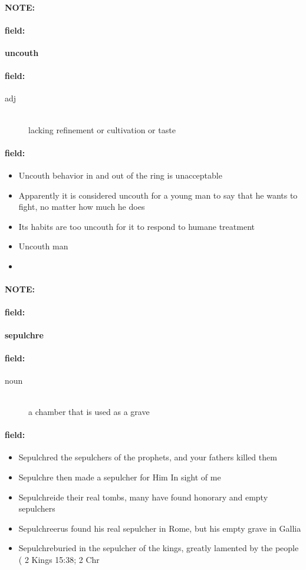 \documentclass[12pt]{article}
\newenvironment{note}{\paragraph{NOTE:}}{}
\newenvironment{field}{\paragraph{field:}}{}
\begin{document}
\begin{note}
\begin{field}
\textbf{\large uncouth}
\end{field}


\begin{field}
\begin{description}
\item[adj] \hfill \\ 
lacking refinement or cultivation or taste

\end{description}
\end{field}

\begin{field}
\begin{itemize}
\item Uncouth behavior in and out of the ring is unacceptable
\item Apparently it is considered uncouth for a young man to say that he wants to fight, no matter how much he does
\item Its habits are too uncouth for it to respond to humane treatment
\item Uncouth man
\item 
\end{itemize}
\end{field}
\end{note}
\begin{note}
\begin{field}
\textbf{\large sepulchre}
\end{field}


\begin{field}
\begin{description}
\item[noun] \hfill \\ 
a chamber that is used as a grave

\end{description}
\end{field}

\begin{field}
\begin{itemize}
\item Sepulchred the sepulchers of the prophets, and your fathers killed them
\item Sepulchre then made a sepulcher for Him In sight of me
\item Sepulchreide their real tombs, many have found honorary and empty sepulchers
\item Sepulchreerus found his real sepulcher in Rome, but his empty grave in Gallia
\item Sepulchreburied in the sepulcher of the kings, greatly lamented by the people ( 2 Kings 15:38; 2 Chr
\end{itemize}
\end{field}
\end{note}
\end{document}
